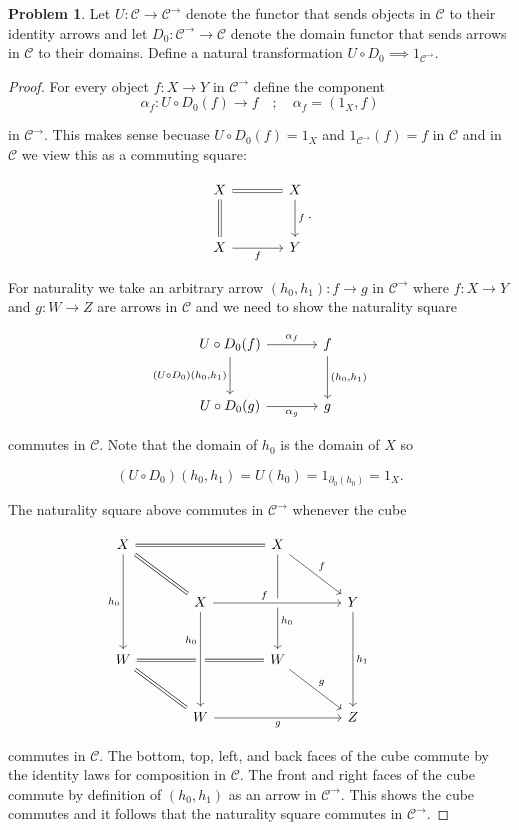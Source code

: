 \documentclass[11pt]{amsart}
\theoremstyle{plain}
\theoremstyle{definition}
\newtheorem{prob}{Problem}
\newcommand{\cC}{{\mathcal C}}
\newcommand{\noi}{{\noindent}}
\begin{document}
\begin{prob}
Let $U : \cC \to \cC^{\to}$ denote the functor that sends objects in $\cC$ to their identity arrows and let $D_0 : \cC^{\to} \to \cC$ denote the domain functor that sends arrows in $\cC$ to their domains. Define a natural transformation $U \circ D_0 \implies 1_{\cC^{\to}}$. 
\end{prob}
\begin{proof}
For every object $f : X \to Y$ in $\cC^{\to}$ define the component 
\[ \alpha_f : U \circ D_0 (f) \to f \quad ; \quad \alpha_f = (1_X, f)\]

\noi in $\cC^{\to}$. This makes sense becuase $U \circ D_0 (f) = 1_X$ and $1_{\cC^\to}(f) = f$ in $\cC$ and in $\cC$ we view this as a commuting square: 

\[\begin{tikzcd}[column sep = large, row sep = large]
X \dar[equals] \rar[equals] & X \dar["f"] \\
X \rar["f"'] & Y
\end{tikzcd}.\]

\noi For naturality we take an arbitrary arrow $(h_0, h_1) : f \to g$ in $\cC^\to$ where $f : X \to Y$ and $g : W \to Z$ are arrows in $\cC$ and we need to show the naturality square 

\[\begin{tikzcd}[column sep = large, row sep = large]
U \circ D_0(f) \rar["\alpha_f"] \dar["(U \circ D_0) (h_0{,} h_1)"']& f \dar["(h_0{,}h_1)"] \\
U \circ D_0(g) \rar["\alpha_g"'] & g
\end{tikzcd}\]

\noi commutes in $\cC$. Note that the domain of $h_0$ is the domain of $X$ so 

\[ (U \circ D_0)(h_0 , h_1) = U (h_0) = 1_{\partial_0(h_0)} = 1_X.\]

\noi The naturality square above commutes in $\cC^\to$ whenever the cube 

\[\begin{tikzcd}[column sep = large, row sep = large]
	X && X &&  \\
	& X && Y \\
	W && W \\
	& W && Z
	\arrow[from=1-1, to=1-3, equals]
	\arrow["{h_0}"', from=1-1, to=3-1]
	\arrow["{h_0}"{pos=0.7}, from=1-3, to=3-3]
	\arrow[from=3-1, to=3-3, equals]
	\arrow[from=3-1, to=4-2, equals]
	\arrow[from=1-1, to=2-2, equals]
	\arrow["f", from=1-3, to=2-4]
	\arrow["g", from=3-3, to=4-4]
	\arrow["f"{pos=0.4}, from=2-2, to=2-4, crossing over]
	\arrow["{h_0}"'{pos=0.3}, from=2-2, to=4-2, crossing over]
	\arrow["{h_1}", from=2-4, to=4-4]
	\arrow["g"', from=4-2, to=4-4, crossing over]
\end{tikzcd}\]

\noi commutes in $\cC$. The bottom, top, left, and back faces of the cube commute by the identity laws for composition in $\cC$. The front and right faces of the cube commute by definition of $(h_0, h_1)$ as an arrow in $\cC^\to$. This shows the cube commutes and it follows that the naturality square commutes in $\cC^\to$. 
\end{proof}
\end{document}
